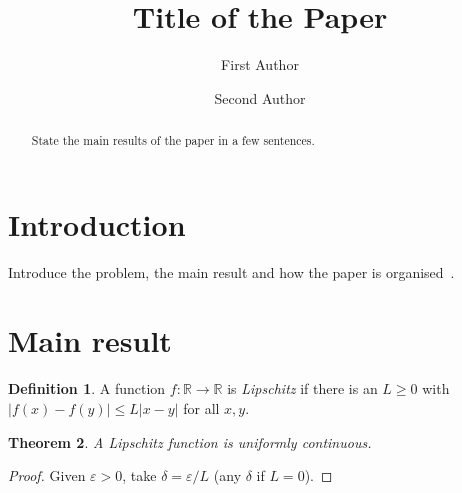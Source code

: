 \documentclass{aomart}
\title[Short title]{Title of the Paper}
\author{First Author}
\author{Second Author}
\newtheorem{theorem}{Theorem}[section]
\theoremstyle{definition}
\newtheorem{definition}[theorem]{Definition}
\numberwithin{equation}{section}
\begin{document}
\begin{abstract}
State the main results of the paper in a few sentences.
\end{abstract}

\maketitle

\section{Introduction}
Introduce the problem, the main result and how the paper is organised~\cite{rudin1987real}.

\section{Main result}
\begin{definition}
A function $f\colon \mathbb{R} \to \mathbb{R}$ is \emph{Lipschitz} if there is
an $L \ge 0$ with $\lvert f(x) - f(y) \rvert \le L \lvert x - y \rvert$ for all $x, y$.
\end{definition}

\begin{theorem}\label{thm:main}
A Lipschitz function is uniformly continuous.
\end{theorem}

\begin{proof}
Given $\varepsilon > 0$, take $\delta = \varepsilon / L$ (any $\delta$ if $L = 0$).
\end{proof}



\end{document}
